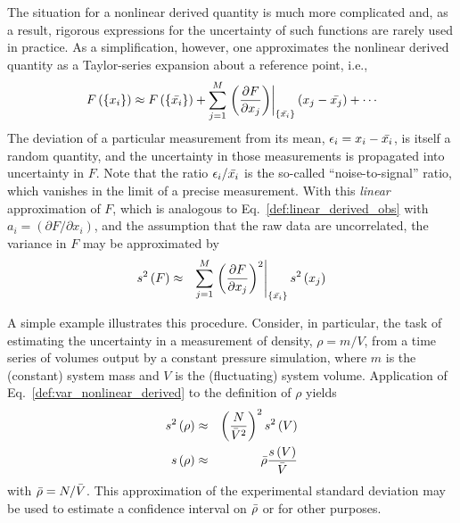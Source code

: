 The situation for a nonlinear derived quantity is much more complicated and, as a result, rigorous expressions for the uncertainty of such functions are rarely used in practice. As a simplification, however, one approximates the nonlinear derived quantity as a Taylor-series expansion about a reference point, i.e.,
%
\begin{equation}
  F\left( \left\{x_i\right\} \right)
  \approx
  F\left( \left\{\mean{x_i}\right\} \right)
  + \sum_{j=1}^M \left.
    \left( \dfrac{\partial F}{\partial x_j}\right)%
  \right|_{\left\{\mean{x_i}\right\}}
  \left(x_j - \mean{x_j}\right) + \cdots
  \label{def:nonlinear_derived_obs_taylor}
\end{equation}
%
The deviation of a particular measurement from its mean, $\epsilon_i = x_i - \bar{x_i}$, is itself a random quantity, and the uncertainty in those measurements is propagated into uncertainty in $F$.
Note that the ratio $\epsilon_i/\bar{x_i}$ is the so-called ``noise-to-signal'' ratio, which vanishes in the limit of a precise measurement. 
With this {\it linear} approximation of $F$, which is analogous to Eq.~\ref{def:linear_derived_obs} with $a_i = \left( \partial F/\partial x_i\right)$, and the assumption that the raw data are uncorrelated, the variance in $F$ may be approximated by
%
\begin{eqnarray}
  \var{F} & \approx & \sum_{j=1}^M
                \left.
                \left( \dfrac{\partial F}{\partial x_j} \right)^2 %
                \right|_{\left\{\mean{x_i}\right\}}
                \var{x_j}
  \label{def:var_nonlinear_derived}
\end{eqnarray}
%

A simple example illustrates this procedure.
Consider, in particular, the task of estimating the uncertainty in a measurement of density, $\rho=m/V$, from a time series of volumes output by a constant pressure simulation, where $m$ is the (constant) system mass and $V$ is the (fluctuating) system volume.
Application of Eq.~\ref{def:var_nonlinear_derived} to the definition of $\rho$ yields
%
\begin{eqnarray}
  s^2\left( \rho \right) & \approx & \left( \dfrac{N}{\bar{V}^2} \right)^2 s^2\left( V \right) \\
  s\left( \rho \right) & \approx & \bar{\rho} \dfrac{s\left( V \right)}{\bar{V}}
  \label{ex:density_linearized}
\end{eqnarray}
%
with $\bar{\rho} = N/\bar{V}$.
This approximation of the experimental standard deviation may be used to estimate a confidence interval on $\bar{\rho}$ or for other purposes.

